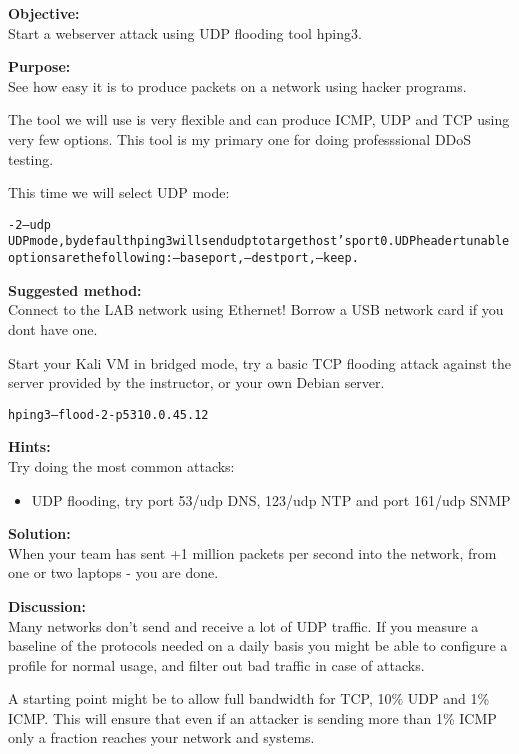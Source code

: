 \documentclass[a4paper,11pt,notitlepage]{report}
\begin{document}
{\bf Objective:}\\
Start a webserver attack using UDP flooding tool hping3.

{\bf Purpose:}\\
See how easy it is to produce packets on a network using hacker programs.

The tool we will use is very flexible and can produce ICMP, UDP and TCP using very few options. This tool is my primary one for doing professsional DDoS testing.

This time we will select UDP mode:

\begin{alltt}\footnotesize
-2 --udp
       UDP mode, by default hping3 will send udp to target host's port 0.  UDP header  tunable
       options are the following: --baseport, --destport, --keep.
\end{alltt}

{\bf Suggested method:}\\
Connect to the LAB network using Ethernet! Borrow a USB network card if you dont have one.

Start your Kali VM in bridged mode, try a basic TCP flooding attack against the server provided by the instructor, or your own Debian server.

\begin{alltt}\footnotesize
hping3 --flood -2 -p 53 10.0.45.12
\end{alltt}



{\bf Hints:}\\

Try doing the most common attacks:
\begin{itemize}
\item UDP flooding, try port 53/udp DNS, 123/udp NTP and port 161/udp SNMP
\end{itemize}

{\bf Solution:}\\
When your team has sent +1 million packets per second into the network, from one or two laptops - you are done.

{\bf Discussion:}\\
Many networks don't send and receive a lot of UDP traffic. If you measure a baseline of the protocols needed on a daily basis you might be able to configure a profile for normal usage, and filter out bad traffic in case of attacks.

A starting point might be to allow full bandwidth for TCP, 10\% UDP and 1\% ICMP. This will ensure that even if an attacker is sending more than 1\% ICMP only a fraction reaches your network and systems.
\end{document}
